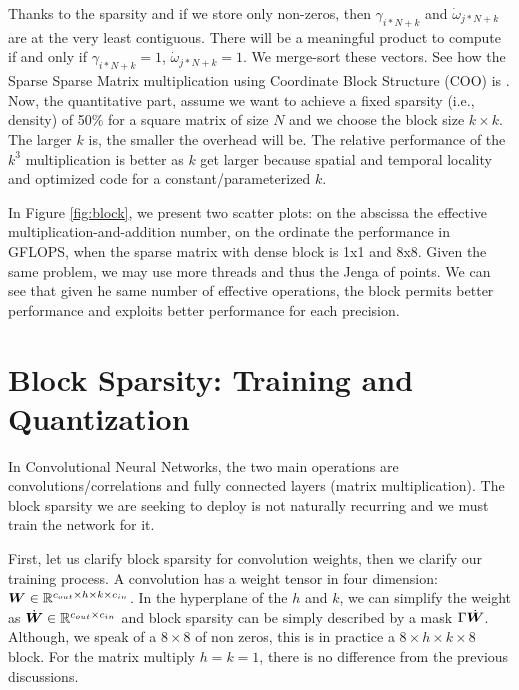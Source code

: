 \documentclass[sigconf]{acmart}
\begin{document}
Thanks to the sparsity and if we store only non-zeros, then
$\gamma_{i*N+k}$ and $\dot{\omega}_{j*N+k}$ are at the very least
contiguous. There will be a meaningful product to compute if and only
if $\gamma_{i*N+k} =1$, $\dot{\omega}_{j*N+k} =1$.  We merge-sort
these vectors.  See how the Sparse Sparse Matrix multiplication using
Coordinate Block Structure (COO) is \cite{PaoloG2020}.  Now, the
quantitative part, assume we want to achieve a fixed sparsity (i.e.,
density) of 50\% for a square matrix of size $N$ and we choose the
block size $k \times k$. The larger $k$ is, the smaller the overhead
will be.  The relative performance of the $k^3$ multiplication is
better as $k$ get larger because spatial and temporal locality and
optimized code for a constant/parameterized $k$.


In Figure \ref{fig:block}, we present two scatter plots: on the
abscissa the effective multiplication-and-addition number, on the
ordinate the performance in GFLOPS, when the sparse matrix with dense
block is 1x1 and 8x8. Given the same problem, we may use more threads
and thus the Jenga of points.  We can see that given he same number of
effective operations, the block permits better performance and
exploits better performance for each precision.



\section{Block Sparsity: Training and Quantization}
\label{sec:training}

In Convolutional Neural Networks, the two main operations are
convolutions/correlations and fully connected layers (matrix
multiplication). The block sparsity we are seeking to deploy is not
naturally recurring and  we must train the network for it.

First, let us clarify block sparsity for convolution weights, then we
clarify our training process. A convolution has a weight tensor in
four dimension: ${\boldsymbol W} \in \mathbb{R}^{c_{out}\times h \times k \times
  c_{in}}$. In the hyperplane of the $h$ and $k$, 
  we can simplify the weight as $\dot{{\boldsymbol W}} \in \mathbb{R}^{c_{out}
  \times c_{in}}$ and block sparsity can be simply described by a mask
$\Gamma\dot{{\boldsymbol W}}$. Although, we speak of a $8\times 8$ of non
zeros, this is in practice a $8\times h\times k\times 8$ block. For
the matrix multiply $h=k=1$, there is no difference from the
previous discussions.
\end{document}
